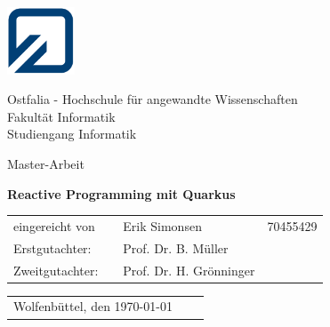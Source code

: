 \begin{minipage}{2.1cm}
	\includegraphics[width=2cm]{resources/fh_logo_klein.jpg}
\end{minipage}
\begin{minipage}{10.0cm}
	Ostfalia - Hochschule für angewandte Wissenschaften\\
	Fakultät Informatik\\
	Studiengang Informatik
\end{minipage}

\vspace{35mm}

\begin{center}
	{\LARGE Master-Arbeit}
	\\[10mm]
\end{center}

\begin{center}
	\LARGE \textbf{Reactive Programming mit Quarkus\\[28mm]}
\end{center}

\begin{table}[h]
	\centering
	\hspace{50mm}\begin{tabular}{lcll}
		eingereicht von &  & Erik Simonsen           & 70455429 \\

		Erstgutachter:  &  & Prof. Dr. B. Müller     &          \\
		Zweitgutachter: &  & Prof. Dr. H. Grönninger &          \\
	\end{tabular}
\end{table}

\vspace{30mm}

\begin{table}[h]
	\begin{tabular}{lll}
		Wolfenbüttel, den \today \\
	\end{tabular}
\end{table}
\clearpage
